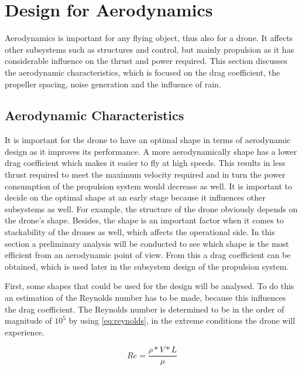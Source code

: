 \section{Design for Aerodynamics}
\label{sec:aerocalc}

Aerodynamics is important for any flying object, thus also for a drone. It affects other subsystems such as structures and control, but mainly propulsion as it has considerable influence on the thrust and power required. This section discusses the aerodynamic characteristics, which is focused on the drag coefficient, the propeller spacing, noise generation and the influence of rain.

\subsection{Aerodynamic Characteristics}
\label{subsec:aerocharact}

It is important for the drone to have an optimal shape in terms of aerodynamic design as it improves its performance. A more aerodynamically shape has a lower drag coefficient which makes it easier to fly at high speeds. This results in less thrust required to meet the maximum velocity required and in turn the power consumption of the propulsion system would decrease as well. It is important to decide on the optimal shape at an early stage because it influences other subsystems as well. For example, the structure of the drone obviously depends on the drone's shape. Besides, the shape is an important factor when it comes to stackability of the drones as well, which affects the operational side. In this section a preliminary analysis will be conducted to see which shape is the most efficient from an aerodynamic point of view. From this a drag coefficient can be obtained, which is used later in the subsystem design of the propulsion system. 

First, some shapes that could be used for the design will be analysed. To do this an estimation of the Reynolds number has to be made, because this influences the drag coefficient. The Reynolds number is determined to be in the order of magnitude of $10^5$ by using \autoref{eq:reynolds}, in the extreme conditions the drone will experience. 

\begin{equation}
\label{eq:reynolds}
    Re = \frac{\rho*V*L}{\mu}
\end{equation}

